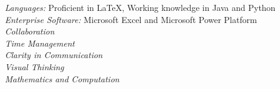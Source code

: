 \documentclass[margin, 10pt]{res} %
\begin{document}
\begin{resume}
{\sl Languages:} Proficient in \LaTeX, Working knowledge in Java and Python\\
{\sl Enterprise Software:} Microsoft Excel and Microsoft Power Platform\\
{\sl Collaboration}\\
{\sl Time Management}\\
{\sl Clarity in Communication}\\
{\sl Visual Thinking}\\
{\sl Mathematics and Computation}



\end{resume}
\end{document}
